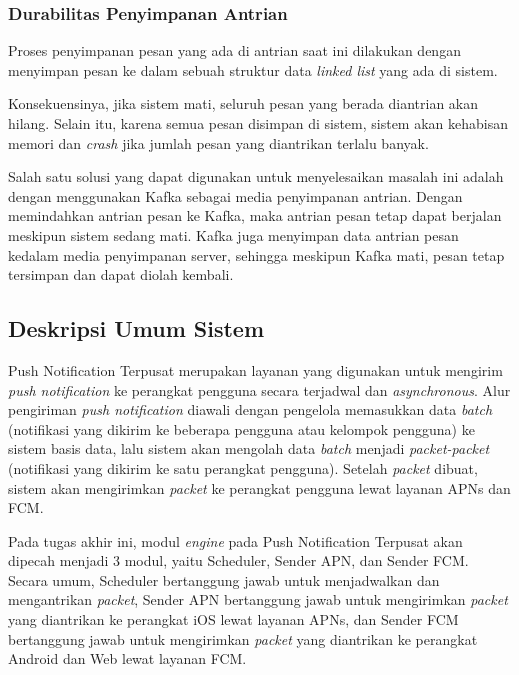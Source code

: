 \subsubsection{Durabilitas Penyimpanan Antrian}
\par Proses penyimpanan pesan yang ada di antrian saat ini dilakukan dengan menyimpan pesan ke dalam sebuah struktur data \textit{linked list} yang ada di sistem.
\par Konsekuensinya, jika sistem mati, seluruh pesan yang berada diantrian akan hilang. Selain itu, karena semua pesan disimpan di sistem, sistem akan kehabisan memori dan \textit{crash} jika jumlah pesan yang diantrikan terlalu banyak.
\par Salah satu solusi yang dapat digunakan untuk menyelesaikan masalah ini adalah dengan menggunakan Kafka sebagai media penyimpanan antrian. Dengan memindahkan antrian pesan ke Kafka, maka antrian pesan tetap dapat berjalan meskipun sistem sedang mati. Kafka juga menyimpan data antrian pesan kedalam media penyimpanan server, sehingga meskipun Kafka mati, pesan tetap tersimpan dan dapat diolah kembali.

\subsection{Deskripsi Umum Sistem}
\par Push Notification Terpusat merupakan layanan yang digunakan untuk mengirim \textit{push notification} ke perangkat pengguna secara terjadwal dan \textit{asynchronous}. Alur pengiriman \textit{push notification} diawali dengan pengelola memasukkan data \textit{batch} (notifikasi yang dikirim ke beberapa pengguna atau kelompok pengguna) ke sistem basis data, lalu sistem akan mengolah data \textit{batch} menjadi \textit{packet-packet} (notifikasi yang dikirim ke satu perangkat pengguna). Setelah \textit{packet} dibuat, sistem akan mengirimkan \textit{packet} ke perangkat pengguna lewat layanan APNs dan FCM.
\par Pada tugas akhir ini, modul \textit{engine} pada Push Notification Terpusat akan dipecah menjadi 3 modul, yaitu Scheduler, Sender APN, dan Sender FCM. Secara umum, Scheduler bertanggung jawab untuk menjadwalkan dan mengantrikan \textit{packet}, Sender APN bertanggung jawab untuk mengirimkan \textit{packet} yang diantrikan ke perangkat iOS lewat layanan APNs, dan Sender FCM bertanggung jawab untuk mengirimkan \textit{packet} yang diantrikan ke perangkat Android dan Web lewat layanan FCM.

